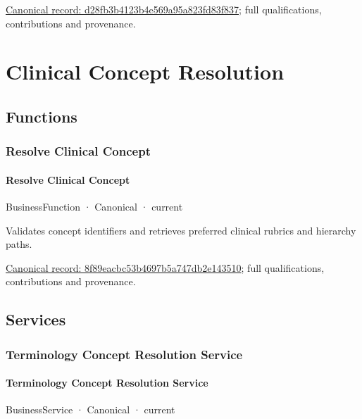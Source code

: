 {\footnotesize \href{../../../../continuum/business/business-service/d28fb3b4123b4e569a95a823fd83f837.md}{Canonical record: d28fb3b4123b4e569a95a823fd83f837}; full qualifications, contributions and provenance.}\par
\section{Clinical Concept Resolution}

\subsection{Functions}

\subsubsection{Resolve Clinical Concept}

\paragraph{Resolve Clinical Concept}

\label{element:8f89eacbc53b4697b5a747db2e143510}
{\small BusinessFunction · Canonical · current}\par

Validates concept identifiers and retrieves preferred clinical rubrics and hierarchy paths.


{\footnotesize \href{../../../../continuum/business/business-function/8f89eacbc53b4697b5a747db2e143510.md}{Canonical record: 8f89eacbc53b4697b5a747db2e143510}; full qualifications, contributions and provenance.}\par
\subsection{Services}

\subsubsection{Terminology Concept Resolution Service}

\paragraph{Terminology Concept Resolution Service}

\label{element:3be22abcc49045c7a609bdf6428fe15a}
{\small BusinessService · Canonical · current}\par

